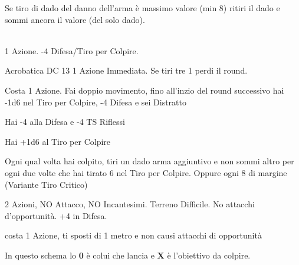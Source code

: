 \documentclass[landscape,10pt,a4paper]{article}
\begin{document}
\begin{multicols}{3}
\begin{dmbox}[title=Esplosione del Danno - pagina \pageref{esplosionedeldanno}]
Se tiro di dado del danno dell'arma è massimo valore (min 8) ritiri il dado e sommi ancora il valore (del solo dado).
\end{dmbox}

\begin{dmbox}[title=Alzarsi da prono - pagina \pageref{alzarsidaprono}]
\textbf{}\\
1 Azione. -4 Difesa/Tiro per Colpire.

Acrobatica DC 13 1 Azione Immediata. Se tiri tre 1 perdi il round.
\end{dmbox}



\begin{dmbox}[title=Azione di Scatto - pagina \pageref{azionediscatto}]
Costa 1 Azione. Fai doppio movimento, fino all'inzio del round successivo hai -1d6 nel Tiro per Colpire, -4 Difesa e sei Distratto
\end{dmbox}

\begin{dmbox}[title=Difesa da Sorpresi - pagina \pageref{difesasorpresi}]
Hai -4 alla Difesa e -4 TS Riflessi
\end{dmbox}

\begin{dmbox}[title=Attacco a Tocco - pagina \pageref{difesaatocco}]
Hai +1d6 al Tiro per Colpire
\end{dmbox}

\begin{dmbox}[title=Tiro Critico - pagina \pageref{tirocritico}]
Ogni qual volta hai colpito, tiri un dado arma aggiuntivo e non sommi altro per ogni due volte che hai tirato 6 nel Tiro per Colpire. Oppure ogni 8 di margine (Variante Tiro Critico)
\end{dmbox}

\begin{dmbox}[title=Difesa Totale - pagina \pageref{difesatotale}]
2 Azioni, NO Attacco, NO Incantesimi. Terreno Difficile. No attacchi d'opportunità. +4 in Difesa.
\end{dmbox}

\begin{dmbox}[title=Disingaggiare - pagina \pageref{disingaggiare}]
costa 1 Azione, ti sposti di 1 metro e non causi attacchi di opportunità
\end{dmbox}

\begin{dmbox}[title=Armi a spargimento - pagina \pageref{attacchiarmidaspargimento}]
In questo schema lo \textbf{0} è colui che lancia e \textbf{X} è l'obiettivo da colpire.\\


\end{dmbox}
\end{multicols}
\end{document}
